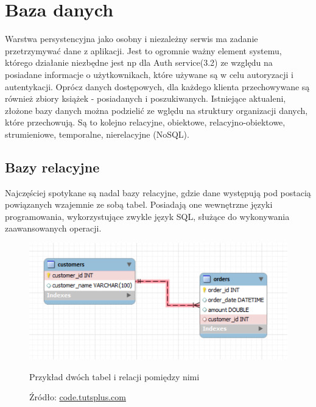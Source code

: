 \section{Baza danych}
Warstwa persystencyjna jako osobny i niezależny serwis ma zadanie przetrzymywać dane z aplikacji. Jest to ogromnie ważny element systemu, którego działanie niezbędne jest np dla Auth service(3.2) ze względu na posiadane informacje o użytkownikach, które używane są w celu autoryzacji i autentykacji.
Oprócz danych dostępowych, dla każdego klienta przechowywane są również zbiory książek - posiadanych i poszukiwanych.
Istniejące aktualeni, złożone bazy danych można podzielić ze wględu na struktury organizacji danych, które przechowują. Są to kolejno relacyjne, obiektowe, relacyjno-obiektowe, strumieniowe, temporalne, nierelacyjne (NoSQL).

\subsection{Bazy relacyjne}
Najczęściej spotykane są nadal bazy relacyjne, gdzie dane występują pod postacią powiązanych wzajemnie ze sobą tabel. Posiadają one wewnętrzne języki programowania, wykorzystujące zwykle język SQL, służące do wykonywania zaawansowanych operacji.
\begin{figure}[H]
	\centering
	\includegraphics[width=\linewidth]{relations.pdf}
	\caption{Przykład dwóch tabel i relacji pomiędzy nimi}
	\caption*{Źródło: \url{code.tutsplus.com}}
\end{figure}

